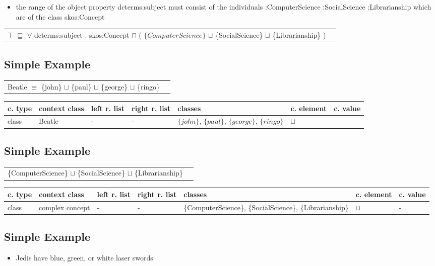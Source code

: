 \documentclass{llncs}
\newenvironment{gcotable}{
  \scriptsize
  \sffamily
  \vspace{0.3cm}
	\begin{center}
  \begin{tabular}{l|l|l|l|l|l|l}
  \hline
  \textbf{c. type} & \textbf{context class} & \textbf{left r. list} & \textbf{right r. list} & \textbf{classes} & \textbf{c. element} & \textbf{c. value} \\
  \hline

}{
  \hline
  \end{tabular}
	\end{center}
}
\newenvironment{DL}{
	\begin{center}
  \begin{tabular}{r l}

}{
  \end{tabular}
	\end{center}
}
\begin{document}
\begin{itemize}
	\item the range of the object property dcterms:subject must consist of the individuals :ComputerScience :SocialScience :Librarianship which are of the class skos:Concept
\end{itemize}

\begin{DL}
$\top$ $\sqsubseteq$ $\forall$ dcterms:subject . skos:Concept $\sqcap$ ( $\{ComputerScience\}$ $\sqcup$ \{SocialScience\} $\sqcup$ \{Librarianship\} ) \\
\end{DL}

\subsection{Simple Example}

\begin{DL}
Beatle $\equiv$ \{john\} $\sqcup$ \{paul\} $\sqcup$ \{george\} $\sqcup$ \{ringo\} \\
\end{DL}

\begin{gcotable}
class & Beatle & - & - & $\{john\}$, $\{paul\}$, $\{george\}$, $\{ringo\}$ & $\sqcup$ \\
\end{gcotable}

\subsection{Simple Example}

\begin{DL}
\{ComputerScience\} $\sqcup$ \{SocialScience\} $\sqcup$ \{Librarianship\} \\
\end{DL}

\begin{gcotable}
class & complex concept & - & - & \{ComputerScience\}, \{SocialScience\}, \{Librarianship\} & $\sqcup$ & - \\
\end{gcotable}

\subsection{Simple Example}

\begin{itemize}
	\item Jedis have blue, green, or white laser swords
\end{itemize}
\end{document}
